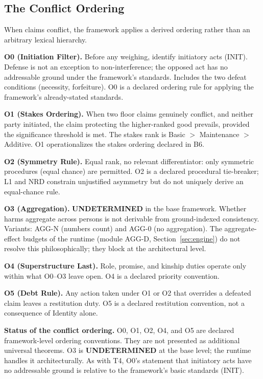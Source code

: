 \documentclass[11pt]{article}
\newcommand{\labelUndetermined}{\textcolor{stU}{\textbf{UNDETERMINED}}}
\begin{document}
\subsection{The Conflict Ordering}\label{sec:conflict}
When claims conflict, the framework applies a derived ordering rather than an arbitrary lexical hierarchy.
\begin{paperbox}
\textbf{O0 (Initiation Filter).} Before any weighing, identify initiatory acts (INIT). Defense is not an exception to non-interference; the opposed act has no addressable ground under the framework's standards. Includes the two defeat conditions (necessity, forfeiture). O0 is a declared ordering rule for applying the framework's already-stated standards.

\medskip
\textbf{O1 (Stakes Ordering).} When two floor claims genuinely conflict, and neither party initiated, the claim protecting the higher-ranked good prevails, provided the significance threshold is met. The stakes rank is Basic $>$ Maintenance $>$ Additive. O1 operationalizes the stakes ordering declared in B6.

\medskip
\textbf{O2 (Symmetry Rule).} Equal rank, no relevant differentiator: only symmetric procedures (equal chance) are permitted. O2 is a declared procedural tie-breaker; L1 and NRD constrain unjustified asymmetry but do not uniquely derive an equal-chance rule.

\medskip
\textbf{O3 (Aggregation).} \labelUndetermined{} in the base framework. Whether harms aggregate across persons is not derivable from ground-indexed consistency. Variants: AGG-N (numbers count) and AGG-0 (no aggregation). The aggregate-effect budgets of the runtime (module AGG-D, Section~\ref{sec:engine}) do not resolve this philosophically; they block at the architectural level.

\medskip
\textbf{O4 (Superstructure Last).} Role, promise, and kinship duties operate only within what O0--O3 leave open. O4 is a declared priority convention.

\medskip
\textbf{O5 (Debt Rule).} Any action taken under O1 or O2 that overrides a defeated claim leaves a restitution duty. O5 is a declared restitution convention, not a consequence of Identity alone.
\end{paperbox}
\textbf{Status of the conflict ordering.} O0, O1, O2, O4, and O5 are declared framework-level ordering conventions. They are not presented as additional universal theorems. O3 is \labelUndetermined{} at the base level; the runtime handles it architecturally. As with T4, O0's statement that initiatory acts have no addressable ground is relative to the framework's basic standards (INIT).
\end{document}

